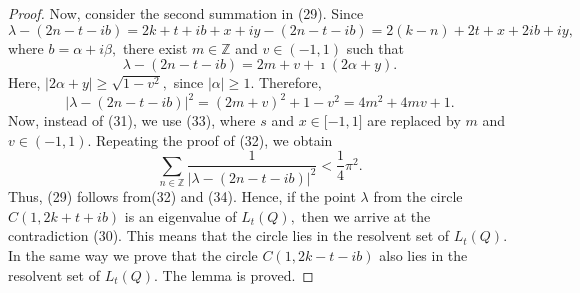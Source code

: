 \documentclass[10pt,a4paper]{amsart}
\begin{document}
\begin{proof}
Now, consider the second summation in (29). Since%
\[
\lambda-\left(  2n-t-ib\right)  =2k+t+ib+x+iy-\left(  2n-t-ib\right)
=2(k-n)+2t+x+2ib+iy,
\]
where $b=\alpha+i\beta,$ there exist $m\in\mathbb{Z}$ and $v\in(-1,1)$ such
that%
\[
\lambda-\left(  2n-t-ib\right)  =2m+v+\imath(2\alpha+y).
\]
Here, $\left\vert 2\alpha+y\right\vert \geq\sqrt{1-v^{2}},$ since $\left\vert
\alpha\right\vert \geq1.$ Therefore,
\begin{equation}
\left\vert \lambda-(2n-t-ib)\right\vert ^{2}=\left(  2m+v\right)  ^{2}%
+1-v^{2}=4m^{2}+4mv+1. \tag{33}%
\end{equation}
Now, instead of (31), we use (33), where $s$ and $x\in\lbrack-1,1]$ are
replaced by $m$ and $v\in(-1,1).$ Repeating the proof of (32), we obtain
\begin{equation}
\sum_{n\in\mathbb{Z}}\frac{1}{\left\vert \lambda-(2n-t-ib)\right\vert ^{2}%
}<\frac{1}{4}\pi^{2}. \tag{34}%
\end{equation}
Thus, (29) follows from(32) and (34). Hence, if the point $\lambda$ from the
circle $C(1,2k+t+ib)$ is an eigenvalue of $L_{t}(Q),$ then we arrive at the
contradiction (30). This means that the circle lies in the resolvent set of
$L_{t}(Q).$ In the same way we prove that the circle $C(1,2k-t-ib)$ also lies
in the resolvent set of $L_{t}(Q).$ The lemma is proved.
\end{proof}
\end{document}
